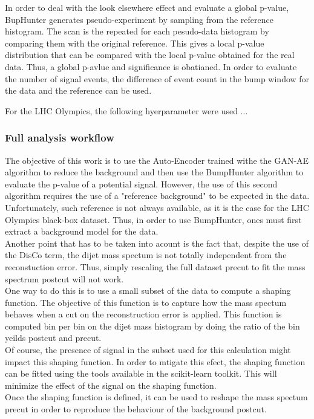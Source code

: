 \documentclass[letterpaper,11pt]{article}
\begin{document}
\noindent In order to deal with the look elsewhere effect and evaluate a global p-value, BupHunter generates pseudo-experiment by sampling from the reference histogram.
The scan is the repeated for each pesudo-data histogram by comparing them with the original reference.
This gives a local p-value distribution that can be compared with the local p-value obtained for the real data.
Thus, a global p-avlue and significance is obatianed.
In order to evaluate the number of signal events, the difference of event count in the bump window for the data and the reference can be used.

\noindent For the LHC Olympics, the following hyerparameter were used ...

\subsubsection{Full analysis workflow}

\noindent The objective of this work is to use the Auto-Encoder trained withe the GAN-AE algorithm to reduce the background and then use the BumpHunter algorithm to evaluate the p-value of a potential signal.
However, the use of this second algorithm requires the use of a "reference background" to be expected in the data.
Unfortunately, such reference is not always available, as it is the case for the LHC Olympics black-box dataset.
Thus, in order to use BumpHunter, ones must first extract a background model for the data.\\
Another point that has to be taken into acount is the fact that, despite the use of the DisCo term, the dijet mass spectum is not totally independent from the reconstuction error.
Thus, simply rescaling the full dataset precut to fit the mass spectrum postcut will not work. \\

\noindent One way to do this is to use a small subset of the data to compute a shaping function.
The objective of this function is to capture how the mass spectum behaves when a cut on the reconstruction error is applied.
This function is computed bin per bin on the dijet mass histogram by doing the ratio of the bin yeilds postcut and precut.\\
Of course, the presence of signal in the subset used for this calculation might impact this shaping function.
In order to mtigate this efect, the shaping function can be fitted using the tools available in the scikit-learn toolkit.
This will minimize the effect of the signal on the shaping function.\\
Once the shaping function is defined, it can be used to reshape the mass spectum precut in order to reproduce the behaviour of the background postcut.\\
\end{document}
